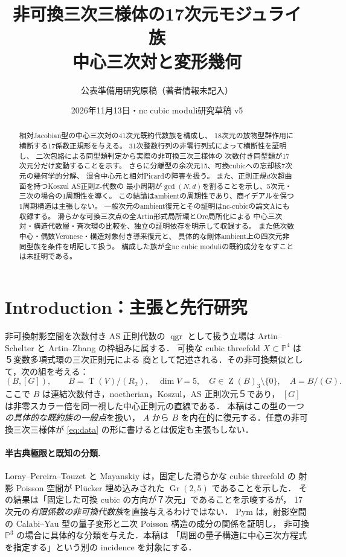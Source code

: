\documentclass[11pt,a4paper]{ltjsarticle}
\title{非可換三次三様体の17次元モジュライ族\\中心三次対と変形幾何}
\author{公表準備用研究原稿（著者情報未記入）}
\date{2026年11月13日・nc cubic moduli研究草稿 v5}
\numberwithin{equation}{section}
\newcommand{\PP}{\mathbb P}
\newcommand{\qgr}{\operatorname{qgr}}
\newcommand{\Z}{\operatorname{Z}}
\newcommand{\Tens}{\operatorname{T}}
\begin{document}
\maketitle
\begin{abstract}
相対Jacobian型の中心三次対の41次元既約代数族を構成し、
18次元の放物型群作用に横断する17係数正規形を与える。
31次整数行列の非零行列式によって横断性を証明し、
二次包絡による同型類判定から実際の非可換三次三様体の
次数付き同型類が17次元分だけ変動することを示す。
さらに分離型の余次元15、可換cubicへの忘却核7次元の幾何学的分解、
混合中心元と相対Picardの障害を扱う。
また、正則正規$d$次超曲面を持つKoszul AS正則$\mathbb Z$-代数の
最小周期が$\gcd(N,d)$を割ることを示し、5次元・三次の場合の1周期性を導く。
この結論はambientの周期性であり、商イデアルを保つ1周期構造は主張しない。
一般次元のambient復元とその証明はnc-cubicの論文Aにも収録する。
滑らかな可換三次点の全Artin形式局所環とOre局所化による
中心三次対・構造代数層・斉次環の比較を、独立の証明依存を明示して収録する。
また低次数中心・偶数Veronese・構造対象付き導来復元と、
具体的な剛体ambient上の四次元非同型族を条件を明記して扱う。
構成した族が全nc cubic moduliの既約成分をなすことは未証明である。
\end{abstract}
\tableofcontents

\section{Introduction：主張と先行研究}\label{sec:intro}
非可換射影空間を次数付き AS 正則代数の $\qgr$ として扱う立場は
Artin--Schelter \cite{AS} と Artin--Zhang \cite{AZ} の枠組みに属する．
可換な cubic threefold $X\subset\PP^4$ は５変数多項式環の三次正則元による
商として記述される．その非可換類似として，次の組を考える：
\begin{equation}\label{eq:data}
 (B,[G]),\qquad B=\Tens(V)/(R_2),\quad\dim V=5,\quad
 G\in\Z(B)_3\setminus\{0\},\quad A=B/(G).
\end{equation}
ここで $B$ は連結次数付き，noetherian，Koszul，AS 正則次元５であり，
$[G]$ は非零スカラー倍を同一視した中心正則元の直線である．
本稿はこの型の\emph{一つの具体的な既約族の一般点}を扱い，
$A$ から $B$ を内在的に復元する．任意の非可換三次三様体が
\eqref{eq:data} の形に書けるとは仮定も主張もしない．

\paragraph{半古典極限と既知の分類.}
Loray--Pereira--Touzet \cite[Theorem~9.1]{LPT} と
Mayanskiy \cite[Theorem~1]{Mayanskiy} は，固定した滑らかな cubic threefold の
射影 Poisson 空間が Pl\"ucker 埋め込みされた $\operatorname{Gr}(2,5)$ であることを示した．
その結果は「固定した可換 cubic の方向が７次元」であることを示唆するが，
17次元の\emph{有限係数の非可換代数族}を直接与えるわけではない．
Pym \cite[Proposition~2.9, Theorem~2.10]{Pym} は，射影空間の
Calabi--Yau 型の量子変形と二次 Poisson 構造の成分の関係を証明し，
非可換 $\PP^3$ の場合に具体的な分類を与えた．本稿は
「周囲の量子構造に中心三次方程式を指定する」という別の incidence を対象にする．
\end{document}
